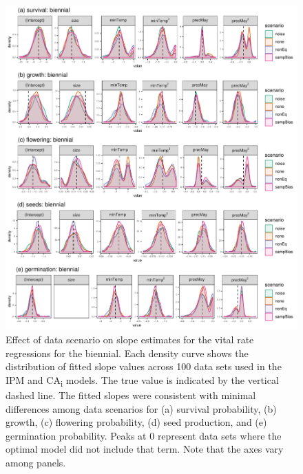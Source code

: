 \documentclass[]{article}
\begin{document}
\begin{figure}
    \centering\includegraphics[width=\linewidth]{../../figs/diag/slope_dens_biennial.pdf}
    \caption{\label{fig:slopesBiennial} Effect of data scenario on slope estimates for the vital rate regressions for the biennial. Each density curve shows the distribution of fitted slope values across 100 data sets used in the IPM and CA\textsubscript{i} models. The true value is indicated by the vertical dashed line. The fitted slopes were consistent with minimal differences among data scenarios for (a) survival probability, (b) growth, (c) flowering probability, (d) seed production, and (e) germination probability. Peaks at 0 represent data sets where the optimal model did not include that term. Note that the axes vary among panels.}
\end{figure}
\end{document}
